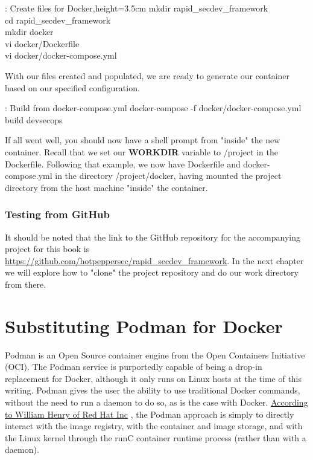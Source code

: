 \justify
\begin{mybox}{\thetcbcounter: Create files for Docker,height=3.5cm}
mkdir rapid\_secdev\_framework\\
cd rapid\_secdev\_framework\\
mkdir docker\\
vi docker/Dockerfile\\
vi docker/docker-compose.yml
\end{mybox}

\justify
With our files created and populated, we are ready to generate our
container based on our specified configuration.

\begin{mybox}{\thetcbcounter: Build from docker-compose.yml }
docker-compose -f docker/docker-compose.yml build devsecops
\end{mybox}

\justify
If all went well, you should now have a shell prompt from "inside" the
new container. Recall that we set our \textbf{WORKDIR} variable to /project in the Dockerfile. Following that example, we now have Dockerfile and docker-compose.yml in the directory /project/docker, having mounted the project directory from the host machine "inside" the container.

\subsubsection{Testing from GitHub}
\justify
It should be noted that the link to the GitHub repository for the accompanying project for this book is
\url{https://github.com/hotpeppersec/rapid_secdev_framework}. In the next chapter we will explore how to "clone" the project repository and do our work directory from there.

\section{Substituting Podman for Docker}
\justify
Podman is an Open Source container engine from the Open Containers Initiative (OCI). The Podman service is purportedly capable of being a drop-in replacement for Docker, although it only runs on Linux hosts at the time of this writing. Podman gives the user the ability to use traditional Docker commands, without the need to run a daemon to do so,
as is the case with Docker.
\href{https://developers.redhat.com/blog/2019/02/21/podman-and-buildah-for-docker-users/}{According to William Henry of Red Hat Inc} , the Podman approach is simply to directly interact with the image registry, with the container and image storage, and with the Linux kernel through the runC container runtime process (rather than with a daemon).

